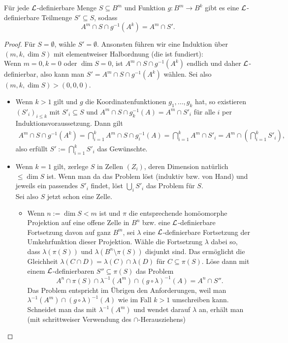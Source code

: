 \begin{lemma}
	Für jede $\mathcal{L}$-definierbare Menge $S\subseteq B^m$ und Funktion $g:B^m\rightarrow B^k$ gibt es eine $\mathcal{L}$-definierbare Teilmenge $S'\subseteq S$, sodass $$A^m\cap S\cap g^{-1}(A^k)=A^m\cap S'.$$
\end{lemma}
\begin{proof}
	Für $S=\emptyset$, wähle $S'=\emptyset$. Ansonsten führen wir eine Induktion über $(m,k,\dim S)$ mit elementweiser Halbordnung (die ist fundiert):\\
	Wenn $m=0,k=0$ oder $\dim S=0$, ist $A^m\cap S\cap g^{-1}(A^k)$ endlich und daher $\mathcal{L}$-definierbar, also kann man $S'=A^m\cap S\cap g^{-1}(A^k)$ wählen. Sei also $(m,k,\dim S)>(0,0,0)$.
	\begin{itemize}
		\item Wenn $k>1$ gilt und $g$ die Koordinatenfunktionen $g_1,\dots,g_k$ hat, so existieren $(S'_i)_{i\leq k}$ mit $S'_i\subseteq S$ und $A^m\cap S\cap g_k^{-1}(A)=A^m\cap S'_i$ für alle $i$ per Induktionsvoraussetzung. Dann gilt
		\begin{align*}
		A^m\cap S\cap g^{-1}(A^k)=\bigcap\limits_{i=1}^k A^m\cap S\cap g_i^{-1}(A)=\bigcap\limits_{i=1}^k A^m\cap S'_i=A^m\cap(\bigcap\limits_{i=1}^k S'_i),
		\end{align*}
		also erfüllt $S':=\bigcap\limits_{i=1}^k S'_i$ das Gewünschte.
		\item Wenn $k=1$ gilt, zerlege $S$ in Zellen $(Z_i)$, deren Dimension natürlich $\leq\dim S$ ist. Wenn man da das Problem löst (induktiv bzw. von Hand) und jeweils ein passendes $S'_i$ findet, löst $\bigcup\limits_i S'_i$ das Problem für $S$.\\ Sei also $S$ jetzt schon eine Zelle.
		\begin{itemize}
			\item Wenn $n:=\dim S<m$ ist und $\pi$ die entsprechende homöomorphe Projektion auf eine offene Zelle in $B^n$  bzw. eine $\mathcal{L}$-definierbare Fortsetzung davon auf ganz $B^m$, sei $\lambda$ eine $\mathcal{L}$-definierbare Fortsetzung der Umkehrfunktion dieser Projektion. Wähle die Fortsetzung $\lambda$ dabei so, dass $\lambda(\pi(S))$ und $\lambda(B^n\setminus\pi(S))$ disjunkt sind. Das ermöglicht die Gleichheit $\lambda(C\cap D)=\lambda(C)\cap\lambda(D)$ für $C\subseteq\pi(S)$. Löse dann mit einem $\mathcal{L}$-definierbaren $S''\subseteq \pi(S)$ das Problem $$A^n\cap\pi(S)\cap\lambda^{-1}(A^m)\cap (g\circ\lambda)^{-1}(A)=A^n\cap S''.$$
			Das Problem entspricht im Übrigen den Anforderungen, weil man\linebreak $\lambda^{-1}(A^m)\cap (g\circ\lambda)^{-1}(A)$ wie im Fall $k>1$ umschreiben kann. Schneidet man das mit $\lambda^{-1}(A^m)$ und wendet darauf $\lambda$ an, erhält man (mit schrittweiser Verwendung des $\cap$-Herausziehens)

\end{itemize}
\end{itemize}
\end{proof}
